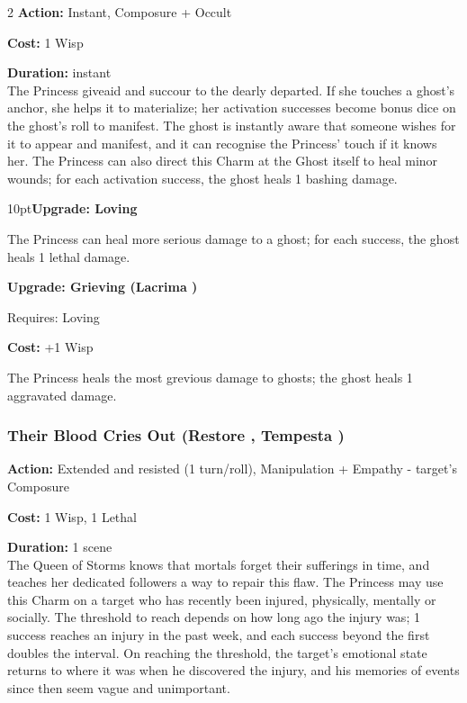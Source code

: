 \begin{multicols}{2}
\noindent \textbf{Action:} Instant, Composure + Occult

\noindent \textbf{Cost:} 1 Wisp

\noindent \textbf{Duration:} instant \\

\noindent The Princess giveaid and succour to the dearly departed. If she touches a ghost's anchor, she helps it to materialize; her activation successes become bonus dice on the ghost's roll to manifest. The ghost is instantly aware that someone wishes for it to appear and manifest, and it can recognise the Princess' touch if it knows her. The Princess can also direct this Charm at the Ghost itself to heal minor wounds; for each activation success, the ghost heals 1 bashing damage.
\begin{myindentpar}{10pt}\textbf{Upgrade: Loving}

The Princess can heal more serious damage to a ghost; for each success, the ghost heals 1 lethal damage.

\textbf{Upgrade: Grieving (Lacrima \textbullet\textbullet)}

\noindent Requires: Loving

\noindent \textbf{Cost:} +1 Wisp

The Princess heals the most grevious damage to ghosts; the ghost heals 1 aggravated damage.\end{myindentpar}

\subsubsection*{Their Blood Cries Out (Restore \textbullet\textbullet, Tempesta \textbullet\textbullet\textbullet)}

\noindent \textbf{Action:} Extended and resisted (1 turn/roll), Manipulation + Empathy - target's Composure

\noindent \textbf{Cost:} 1 Wisp, 1 Lethal
 
\noindent \textbf{Duration:} 1 scene \\

\noindent The Queen of Storms knows that mortals forget their sufferings in time, and teaches her dedicated followers a way to repair this flaw. The Princess may use this Charm on a target who has recently been injured, physically, mentally or socially. The threshold to reach depends on how long ago the injury was; 1 success reaches an injury in the past week, and each success beyond the first doubles the interval. On reaching the threshold, the target's emotional state returns to where it was when he discovered the injury, and his memories of events since then seem vague and unimportant.


\end{multicols}
